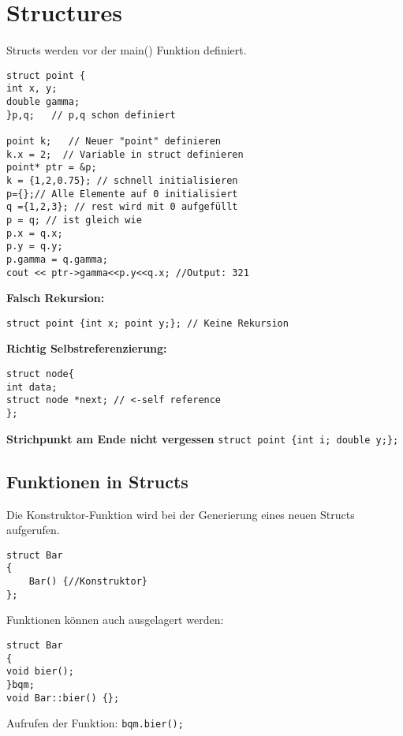 \section{Structures}

Structs werden vor der main() Funktion definiert.
\begin{lstlisting}[mathescape]
struct point {
int x, y;
double gamma;
}p,q;   // p,q schon definiert

point k;   // Neuer "point" definieren
k.x = 2;  // Variable in struct definieren
point* ptr = &p;
k = {1,2,0.75}; // schnell initialisieren
p={};// Alle Elemente auf 0 initialisiert
q ={1,2,3}; // rest wird mit 0 aufgefüllt
p = q; // ist gleich wie
p.x = q.x; 
p.y = q.y;
p.gamma = q.gamma;
cout << ptr->gamma<<p.y<<q.x; //Output: 321
\end{lstlisting}

\textbf{Falsch Rekursion:} 
\begin{lstlisting}[mathescape]
struct point {int x; point y;}; // Keine Rekursion
\end{lstlisting}
\textbf{Richtig Selbstreferenzierung:} 
\begin{lstlisting}[mathescape]
struct node{
int data;
struct node *next; // <-self reference
};
\end{lstlisting}
\textbf{Strichpunkt am Ende nicht vergessen} 
\texttt{struct point \{int i; double y;\};}

\subsection{Funktionen in Structs}
Die Konstruktor-Funktion wird bei der Generierung eines neuen Structs aufgerufen.
\begin{lstlisting}[mathescape]
struct Bar
{
	Bar() {//Konstruktor}
};
\end{lstlisting}
Funktionen können auch ausgelagert werden:
\begin{lstlisting}[mathescape]
struct Bar
{
void bier();
}bqm;
void Bar::bier() {};
\end{lstlisting}
Aufrufen der Funktion: \texttt{bqm.bier();}


























